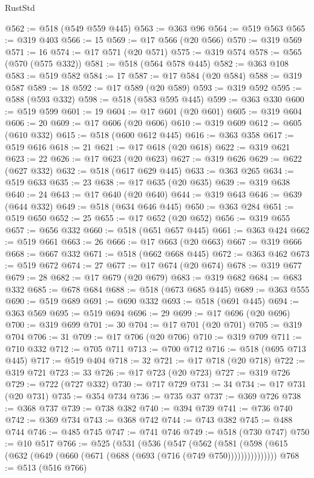 \begin{lexlean}{RustStd}
\begin{coremodule}
@562 := @518 (@549 @559 @445)
@563 := @363 @96
@564 := @519 @563
@565 := @319 @403
@566 := 15
@569 := @17 @566 (@20 @566)
@570 := @319 @569
@571 := 16
@574 := @17 @571 (@20 @571)
@575 := @319 @574
@578 := @565 (@570 (@575 @332))
@581 := @518 (@564 @578 @445)
@582 := @363 @108
@583 := @519 @582
@584 := 17
@587 := @17 @584 (@20 @584)
@588 := @319 @587
@589 := 18
@592 := @17 @589 (@20 @589)
@593 := @319 @592
@595 := @588 (@593 @332)
@598 := @518 (@583 @595 @445)
@599 := @363 @330
@600 := @519 @599
@601 := 19
@604 := @17 @601 (@20 @601)
@605 := @319 @604
@606 := 20
@609 := @17 @606 (@20 @606)
@610 := @319 @609
@612 := @605 (@610 @332)
@615 := @518 (@600 @612 @445)
@616 := @363 @358
@617 := @519 @616
@618 := 21
@621 := @17 @618 (@20 @618)
@622 := @319 @621
@623 := 22
@626 := @17 @623 (@20 @623)
@627 := @319 @626
@629 := @622 (@627 @332)
@632 := @518 (@617 @629 @445)
@633 := @363 @265
@634 := @519 @633
@635 := 23
@638 := @17 @635 (@20 @635)
@639 := @319 @638
@640 := 24
@643 := @17 @640 (@20 @640)
@644 := @319 @643
@646 := @639 (@644 @332)
@649 := @518 (@634 @646 @445)
@650 := @363 @284
@651 := @519 @650
@652 := 25
@655 := @17 @652 (@20 @652)
@656 := @319 @655
@657 := @656 @332
@660 := @518 (@651 @657 @445)
@661 := @363 @424
@662 := @519 @661
@663 := 26
@666 := @17 @663 (@20 @663)
@667 := @319 @666
@668 := @667 @332
@671 := @518 (@662 @668 @445)
@672 := @363 @462
@673 := @519 @672
@674 := 27
@677 := @17 @674 (@20 @674)
@678 := @319 @677
@679 := 28
@682 := @17 @679 (@20 @679)
@683 := @319 @682
@684 := @683 @332
@685 := @678 @684
@688 := @518 (@673 @685 @445)
@689 := @363 @555
@690 := @519 @689
@691 := @690 @332
@693 := @518 (@691 @445)
@694 := @363 @569
@695 := @519 @694
@696 := 29
@699 := @17 @696 (@20 @696)
@700 := @319 @699
@701 := 30
@704 := @17 @701 (@20 @701)
@705 := @319 @704
@706 := 31
@709 := @17 @706 (@20 @706)
@710 := @319 @709
@711 := @710 @332
@712 := @705 @711
@713 := @700 @712
@716 := @518 (@695 @713 @445)
@717 := @519 @404
@718 := 32
@721 := @17 @718 (@20 @718)
@722 := @319 @721
@723 := 33
@726 := @17 @723 (@20 @723)
@727 := @319 @726
@729 := @722 (@727 @332)
@730 := @717 @729
@731 := 34
@734 := @17 @731 (@20 @731)
@735 := @354 @734
@736 := @735 @37
@737 := @369 @726
@738 := @368 @737
@739 := @738 @382
@740 := @394 @739
@741 := @736 @740
@742 := @369 @734
@743 := @368 @742
@744 := @743 @382
@745 := @488 @744
@746 := @485 @745
@747 := @741 @746
@749 := @518 (@730 @747)
@750 := @10 @517
@766 := @525
    (@531
      (@536
        (@547
          (@562
            (@581 (@598 (@615 (@632 (@649 (@660 (@671 (@688 (@693 (@716 (@749 @750)))))))))))))))
@768 := @513 (@516 @766)

\end{coremodule}
\end{lexlean}

